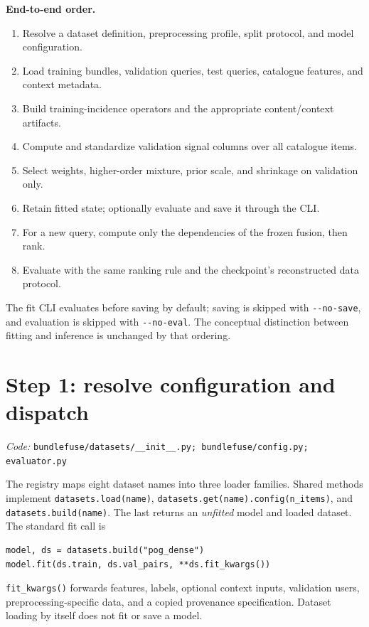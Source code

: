 \documentclass[11pt,a4paper]{article}
\newcommand{\code}[1]{\nolinkurl{#1}}
\newcommand{\src}[1]{\par\begingroup\raggedright\textit{Code: }\code{#1}\par\endgroup}
\numberwithin{equation}{section}
\begin{document}
\textbf{End-to-end order.}
\begin{enumerate}
\item Resolve a dataset definition, preprocessing profile, split protocol, and model configuration.
\item Load training bundles, validation queries, test queries, catalogue features, and context metadata.
\item Build training-incidence operators and the appropriate content/context artifacts.
\item Compute and standardize validation signal columns over all catalogue items.
\item Select weights, higher-order mixture, prior scale, and shrinkage on validation only.
\item Retain fitted state; optionally evaluate and save it through the CLI.
\item For a new query, compute only the dependencies of the frozen fusion, then rank.
\item Evaluate with the same ranking rule and the checkpoint's reconstructed data protocol.
\end{enumerate}
The fit CLI evaluates before saving by default; saving is skipped with \code{--no-save},
and evaluation is skipped with \code{--no-eval}. The conceptual distinction between
fitting and inference is unchanged by that ordering.

\section{Step 1: resolve configuration and dispatch}\label{sec:dispatch}
\src{bundlefuse/datasets/__init__.py; bundlefuse/config.py; evaluator.py}
The registry maps eight dataset names into three loader families. Shared methods implement
\code{datasets.load(name)}, \code{datasets.get(name).config(n_items)}, and
\code{datasets.build(name)}. The last returns an \emph{unfitted} model and loaded dataset.
The standard fit call is
\begin{lstlisting}
model, ds = datasets.build("pog_dense")
model.fit(ds.train, ds.val_pairs, **ds.fit_kwargs())
\end{lstlisting}
\code{fit_kwargs()} forwards features, labels, optional context inputs, validation users,
preprocessing-specific data, and a copied provenance specification. Dataset loading by
itself does not fit or save a model.
\end{document}
